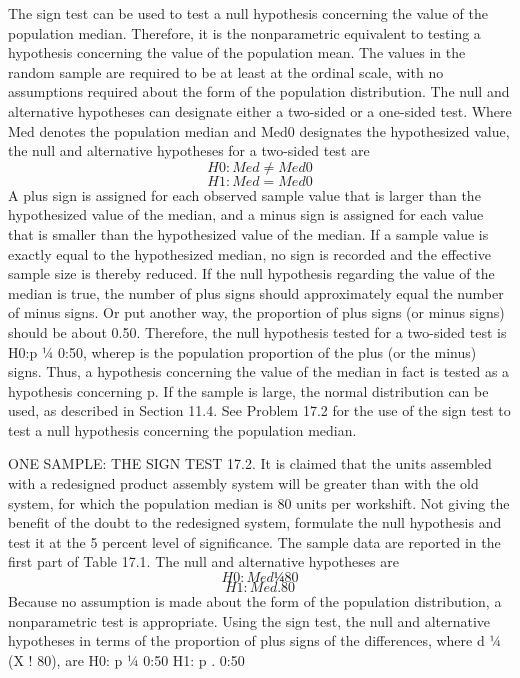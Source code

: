 The sign test can be used to test a null hypothesis concerning the value of the population median. Therefore,
it is the nonparametric equivalent to testing a hypothesis concerning the value of the population mean. The
values in the random sample are required to be at least at the ordinal scale, with no assumptions required about
the form of the population distribution.
The null and alternative hypotheses can designate either a two-sided or a one-sided test. Where Med
denotes the population median and Med0 designates the hypothesized value, the null and alternative hypotheses
for a two-sided test are
\[H0: Med \neq Med0\]
\[H1: Med = Med0\]
A plus sign is assigned for each observed sample value that is larger than the hypothesized value of the
median, and a minus sign is assigned for each value that is smaller than the hypothesized value of the median. If
a sample value is exactly equal to the hypothesized median, no sign is recorded and the effective sample size is
thereby reduced. If the null hypothesis regarding the value of the median is true, the number of plus signs should
approximately equal the number of minus signs. 
Or put another way, the proportion of plus signs (or minus
signs) should be about 0.50. Therefore, the null hypothesis tested for a two-sided test is H0:p ¼ 0:50, wherep is
the population proportion of the plus (or the minus) signs. Thus, a hypothesis concerning the value of the
median in fact is tested as a hypothesis concerning p. If the sample is large, the normal distribution can be used,
as described in Section 11.4.
See Problem 17.2 for the use of the sign test to test a null hypothesis concerning the population median.


ONE SAMPLE: THE SIGN TEST
17.2. It is claimed that the units assembled with a redesigned product assembly system will be greater than
with the old system, for which the population median is 80 units per workshift. Not giving the benefit of
the doubt to the redesigned system, formulate the null hypothesis and test it at the 5 percent level of
significance. The sample data are reported in the first part of Table 17.1.
The null and alternative hypotheses are
\[ H0: Med ¼ 80\]
\[H1: Med . 80\]
Because no assumption is made about the form of the population distribution, a nonparametric test is
appropriate. Using the sign test, the null and alternative hypotheses in terms of the proportion of plus signs of the
differences, where d ¼ (X ! 80), are
H0: p ¼ 0:50
H1: p . 0:50

